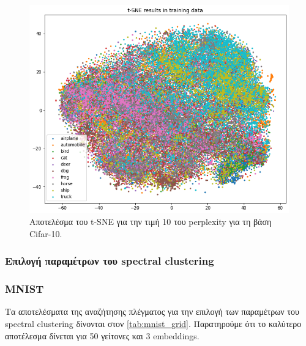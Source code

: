 \documentclass[a4paper]{article}
\begin{document}
\begin{figure}[H]
    \centering
    \includegraphics[width=0.6\linewidth]{cifar/tsne_training.png}
    \caption{Αποτελέσμα του t-SNE για την τιμή 10 του perplexity για τη βάση
    Cifar-10.}
    \label{fig:cifar_tsne}
\end{figure}

\subsubsection{Επιλογή παραμέτρων του spectral clustering}

\subsubsection{MNIST}

Τα αποτελέσματα της αναζήτησης πλέγματος για την επιλογή των παραμέτρων του
spectral clustering δίνονται στον \autoref{tab:mnist_grid}. Παρατηρούμε ότι το
καλύτερο αποτέλεσμα δίνεται για 50 γείτονες και 3 embeddings.
\end{document}
